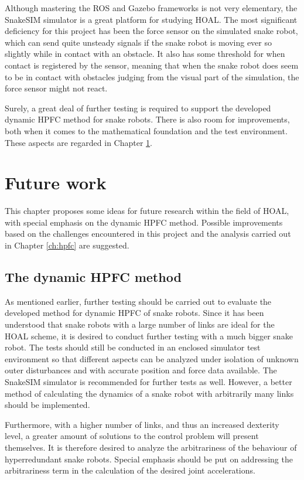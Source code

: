 Although mastering the ROS and Gazebo frameworks is not very elementary, the SnakeSIM simulator is a great platform for studying HOAL. The most significant deficiency for this project has been the force sensor on the simulated snake robot, which can send quite unsteady signals if the snake robot is moving ever so slightly while in contact with an obstacle. It also has some threshold for when contact is registered by the sensor, meaning that when the snake robot does seem to be in contact with obstacles judging from the visual part of the simulation, the force sensor might not react.

Surely, a great deal of further testing is required to support the developed dynamic HPFC method for snake robots. There is also room for improvements, both when it comes to the mathematical foundation and the test environment. These aspects are regarded in Chapter \ref{ch:future}.

\chapter{Future work}\label{ch:future}

This chapter proposes some ideas for future research within the field of HOAL, with special emphasis on the dynamic HPFC method. Possible improvements based on the challenges encountered in this project and the analysis carried out in Chapter \ref{ch:hpfc} are suggested.

\section{The dynamic HPFC method}

As mentioned earlier, further testing should be carried out to evaluate the developed method for dynamic HPFC of snake robots. Since it has been understood that snake robots with a large number of links are ideal for the HOAL scheme, it is desired to conduct further testing with a much bigger snake robot. The tests should still be conducted in an enclosed simulator test environment so that different aspects can be analyzed under isolation of unknown outer disturbances and with accurate position and force data available. The SnakeSIM simulator is recommended for further tests as well. However, a better method of calculating the dynamics of a snake robot with arbitrarily many links should be implemented.

Furthermore, with a higher number of links, and thus an increased dexterity level, a greater amount of solutions to the control problem will present themselves. It is therefore desired to analyze the arbitrariness of the behaviour of hyperredundant snake robots. Special emphasis should be put on addressing the arbitrariness term in the calculation of the desired joint accelerations.

